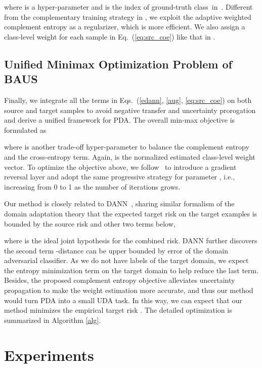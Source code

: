 \documentclass[runningheads]{llncs}
\begin{document}
where  is a hyper-parameter and  is the index of ground-truth class~in~.
Different from the complementary training strategy in \cite{chen2019complement}, we exploit the adaptive weighted complement entropy  as a regularizer, which is more efficient.
We also assign a class-level weight for each sample in Eq.~(\ref{eq:src_coe}) like that in .
	

\subsection{Unified Minimax Optimization Problem of BAUS}
Finally, we integrate all the terms in Eqs.~(\ref{edann}, \ref{aug}, \ref{eq:src_coe}) on both source and target samples to avoid negative transfer and uncertainty prorogation and derive a unified framework for PDA. The overall min-max objective is formulated as

where  is another trade-off hyper-parameter to balance the complement entropy and the cross-entropy term.
Again,  is the normalized estimated class-level weight vector.
To optimize the objective above, we follow~\cite{ganin2015unsupervised} to introduce a gradient reversal layer and adopt the same progressive strategy for parameter , i.e., increasing  from 0 to 1 as the number of iterations grows.


Our method is closely related to DANN~\cite{ganin2015unsupervised}, sharing similar formalism of the domain adaptation theory \cite{ben2010theory} that the expected target risk  on the target examples is bounded by the source risk  and other two terms below, 
	
where  is the ideal joint hypothesis for the combined risk.
DANN further discovers the second term -distance can be upper bounded by error of the domain adversarial classifier.
As we do not have labels of the target domain, we expect the entropy minimization term on the target domain to help reduce the last term.
Besides, the proposed complement entropy objective alleviates uncertainty propagation to make the weight estimation more accurate, and thus our method would turn PDA into a small UDA task.
In this way, we can expect that our method minimizes the empirical target risk .
The detailed optimization is summarized in Algorithm \ref{alg}.


\section{Experiments}
\end{document}
